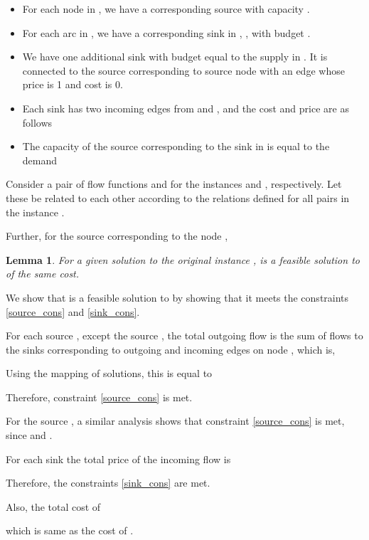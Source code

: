 \documentclass[11pt]{article}
\newenvironment{proof}{\par\noindent{\bf Proof:}}{\mbox{}\hfill\\}
\newtheorem{lemma}{Lemma}[section]
\newcounter{rem}
\begin{document}
\begin{itemize}
\item
For each  node  in , we have a corresponding source
 with capacity .
\item
For each arc   in , we have a corresponding sink in ,
, with budget .


\item
We have one additional sink  with budget equal to the supply  in .
It is connected to the source corresponding to source node  with an
edge whose price is 1 and cost is 0.

\item
Each sink  has two incoming edges from  and , and the
cost and price are as follows




\item
The capacity of the source corresponding to the sink in  is equal to
the demand 



\end{itemize}

Consider a  pair  of flow functions  and  for the instances  and , respectively.
Let these be related to each other according to the relations defined for 
all  pairs in the instance .

Further, for the source  corresponding to the node ,


\begin{lemma}
For a given solution  to the original instance ,  is a feasible solution to
 of the same cost.
\label{FtoFdash} 
\end{lemma}

\begin{proof}
We show that  is a feasible solution to  by showing that it meets the 
constraints \ref{source_cons} and \ref{sink_cons}. 

For each source , except the source ,
the total outgoing flow is the sum of flows
to the sinks corresponding to outgoing and incoming edges on node ,
which is,



Using the mapping of solutions, this is equal to 

Therefore, constraint \ref{source_cons} is met.

For the source , a similar analysis shows that constraint
\ref{source_cons} is met,
since  and .


For each sink  the total price of the incoming flow is 

Therefore, the constraints \ref{sink_cons} are met.

Also, the total cost of  

which is same as the cost of .
\end{proof}
\end{document}
